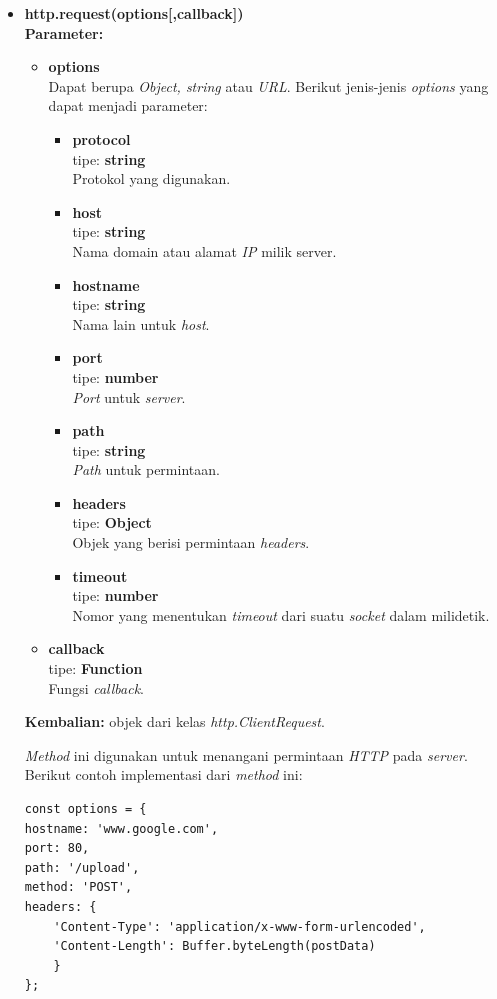 \documentclass[a4paper,twoside]{article}
\begin{document}
\begin{enumerate}
\begin{enumerate}
\begin{itemize}
				\item \textbf{http.request(options[,callback])} \\ 
				\textbf{Parameter:}
				\begin{itemize}
					\item \textbf{options} \\ Dapat berupa \textit{Object, string} atau \textit{URL}. Berikut jenis-jenis \textit{options} yang dapat menjadi parameter:
					\begin{itemize}
						\item \textbf{protocol} \\tipe: \textbf{string} \\ Protokol yang digunakan.
						\item \textbf{host} \\tipe: \textbf{string} \\ Nama domain atau alamat \textit{IP} milik server.
						\item \textbf{hostname} \\tipe: \textbf{string} \\ Nama lain untuk \textit{host}.
						\item \textbf{port} \\tipe: \textbf{number} \\ \textit{Port} untuk \textit{server}.
						\item \textbf{path} \\tipe: \textbf{string} \\ \textit{Path} untuk permintaan.
						\item \textbf{headers} \\tipe: \textbf{Object} \\ Objek yang berisi permintaan \textit{headers}.
						\item \textbf{timeout} \\tipe: \textbf{number} \\ Nomor yang menentukan \textit{timeout} dari suatu \textit{socket} dalam milidetik.
					\end{itemize}
					
					\item \textbf{callback} \\tipe: \textbf{Function} \\ Fungsi \textit{callback}.
				\end{itemize}
				
				\textbf{Kembalian:} objek dari kelas \textit{http.ClientRequest}.
				
				\textit{Method} ini digunakan untuk menangani permintaan \textit{HTTP} pada \textit{server}. Berikut contoh implementasi dari \textit{method} ini:
\begin{lstlisting}
const options = {
hostname: 'www.google.com',
port: 80,
path: '/upload',
method: 'POST',
headers: {
	'Content-Type': 'application/x-www-form-urlencoded',
	'Content-Length': Buffer.byteLength(postData)
	}
};
				

\end{lstlisting}
\end{itemize}
\end{enumerate}
\end{enumerate}
\end{document}
